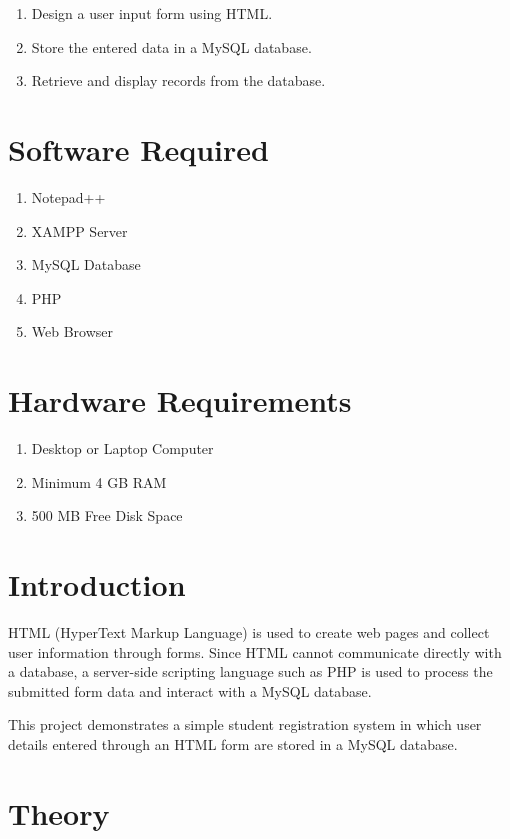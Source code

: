 \documentclass[12pt,a4paper]{report}
\begin{document}
\begin{enumerate}
\item Design a user input form using HTML.
\item Store the entered data in a MySQL database.
\item Retrieve and display records from the database.
\end{enumerate}

\section{Software Required}

\begin{enumerate}
\item Notepad++
\item XAMPP Server
\item MySQL Database
\item PHP
\item Web Browser
\end{enumerate}

\section{Hardware Requirements}

\begin{enumerate}
\item Desktop or Laptop Computer
\item Minimum 4 GB RAM
\item 500 MB Free Disk Space
\end{enumerate}

\section{Introduction}

HTML (HyperText Markup Language) is used to create web pages and collect user information through forms. Since HTML cannot communicate directly with a database, a server-side scripting language such as PHP is used to process the submitted form data and interact with a MySQL database.

This project demonstrates a simple student registration system in which user details entered through an HTML form are stored in a MySQL database.

\section{Theory}
\end{document}
